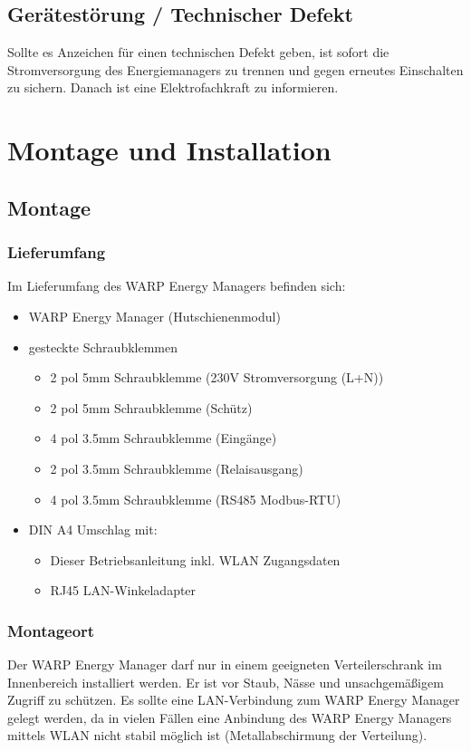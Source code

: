 \documentclass[a4paper,10pt]{article}
\begin{document}
\begin{multicols*}{2}
	\subsection{Gerätestörung / Technischer Defekt}
	Sollte es Anzeichen für einen technischen Defekt geben, ist sofort die
	Stromversorgung des Energiemanagers zu trennen und gegen erneutes Einschalten zu
	sichern. Danach ist eine Elektrofachkraft zu informieren.

	\newpage
	\section{Montage und Installation}
	\subsection{Montage}
	\subsubsection{Lieferumfang}
	Im Lieferumfang des WARP Energy Managers befinden sich:
	\begin{itemize}
		\item WARP Energy Manager (Hutschienenmodul)
		\item gesteckte Schraubklemmen
		\begin{itemize}
			\item 2 pol 5mm Schraubklemme (230V Stromversorgung (L+N))
			\item 2 pol 5mm Schraubklemme (Schütz)
			\item 4 pol 3.5mm Schraubklemme (Eingänge)
			\item 2 pol 3.5mm Schraubklemme (Relaisausgang)
			\item 4 pol 3.5mm Schraubklemme (RS485 Modbus-RTU)
		\end{itemize}
		\item DIN A4 Umschlag mit:
		\begin{itemize}
			\item Dieser Betriebsanleitung inkl. WLAN Zugangsdaten
			\item RJ45 LAN-Winkeladapter
		\end{itemize}
	\end{itemize}

	\subsubsection{Montageort}
	Der WARP Energy Manager darf nur in einem geeigneten Verteilerschrank im
	Innenbereich installiert werden. Er ist vor Staub, Nässe und unsachgemäßigem
	Zugriff zu schützen. Es sollte
	eine LAN-Verbindung zum WARP Energy Manager gelegt werden, da in vielen
	Fällen eine Anbindung des WARP Energy Managers mittels WLAN nicht stabil
	möglich ist (Metallabschirmung der Verteilung).


\end{multicols*}
\end{document}
